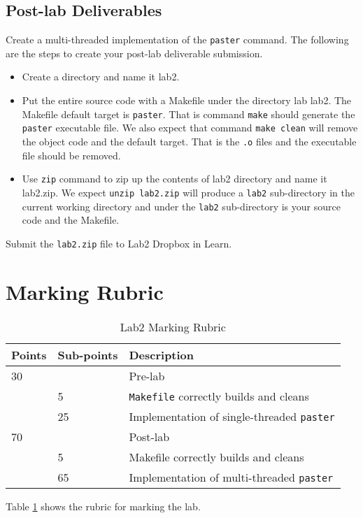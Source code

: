 \subsection{Post-lab Deliverables}
\label{sec:lab2-post-lab-deliverable}
Create a multi-threaded implementation of the \verb+paster+ command.
The following are the steps to create your post-lab deliverable submission.
\begin{itemize}
\item Create a directory and name it lab2.
\item Put the entire source code with a Makefile under the directory lab lab2. The Makefile default target is \verb+paster+. That is command \verb+make+ should generate the \verb+paster+ executable file. We also expect that command \verb+make clean+ will remove the object code and the default target. That is the \verb+.o+ files and the executable file should be removed.
\item Use \verb+zip+ command to zip up the contents of lab2 directory and name it lab2.zip. We expect \verb+unzip lab2.zip+ will produce a \verb+lab2+ sub-directory in the current working directory and under the \verb+lab2+ sub-directory is your source code and the Makefile.
\end{itemize}
Submit the \verb+lab2.zip+ file to Lab2 Dropbox in Learn.


\section{Marking Rubric}
\begin{table}[ht]
\begin{center}
\begin{tabular}{|p{2cm}|p{2cm}|p{9cm}|}
\hline
Points & Sub-points &Description  \\ \hline
30     &    & Pre-lab      \\ \hline
       & 5  & \verb+Makefile+ correctly builds and cleans \\ \hline
       & 25 & Implementation of single-threaded \verb+paster+ \\ \hline
70     &       & Post-lab \\ \hline
       & 5     & Makefile correctly builds and cleans \\ \hline
       & 65    & Implementation of multi-threaded \verb+paster+ \\ \hline
\end{tabular}
\caption{Lab2 Marking Rubric}
\label{tb_lab2_rubric}
\end{center}
\end{table}

Table \ref{tb_lab2_rubric} shows the rubric for marking the lab.

